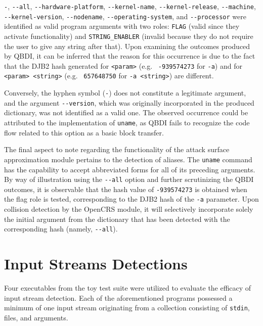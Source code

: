 \documentclass[../main.tex]{subfiles}
\begin{document}
\texttt{-}, \texttt{-\/-all}, \texttt{-\/-hardware-platform},
\texttt{-\/-kernel-name}, \texttt{-\/-kernel-release}, \texttt{-\/-machine}, \\ \texttt{-\/-kernel-version}, 
\texttt{-\/-nodename}, \texttt{-\/-operating-system}, and
\texttt{-\/-processor} were identified as valid program arguments with
two roles: \texttt{FLAG} (valid since they activate functionality) and
\texttt{STRING\_ENABLER} (invalid because they do not require the user
to give any string after that). Upon examining the outcomes produced by
QBDI, it can be inferred that the reason for this occurrence is due to
the fact that the DJB2 hash generated for \texttt{<param>}
(e.g. ~\texttt{-939574273} for \texttt{-a}) and for
\texttt{<param>\ \textless{}string\textgreater{}} (e.g. ~\texttt{657648750} for \texttt{-a <string>})
are different.

Conversely, the hyphen symbol (\texttt{-}) does not constitute a legitimate
argument, and the argument \texttt{-\/-version}, which was originally
incorporated in the produced dictionary, was not identified as a valid one. The
observed occurrence could be attributed to the implementation of
\texttt{uname}, as QBDI fails to recognize the code flow related to this option
as a basic block transfer.

The final aspect to note regarding the functionality of the attack surface
approximation module pertains to the detection of aliases. The \texttt{uname}
command has the capability to accept abbreviated forms for all of its preceding
arguments. By way of illustration using the \texttt{-\/-all} option and further
scrutinizing the QBDI outcomes, it is observable that the hash value of
\texttt{-939574273} is obtained when the flag role is tested, corresponding to
the DJB2 hash of the \texttt{-a} parameter. Upon collision detection by the
OpenCRS module, it will selectively incorporate solely the initial argument
from the dictionary that has been detected with the corresponding hash (namely,
\texttt{-\/-all}).

\hypertarget{input-streams-detections}{%
  \section{Input Streams Detections}\label{input-streams-detections}}

Four executables from the toy test suite were utilized to evaluate the efficacy
of input stream detection. Each of the aforementioned programs possessed a
minimum of one input stream originating from a collection consisting of
\texttt{stdin}, files, and arguments.
\end{document}
